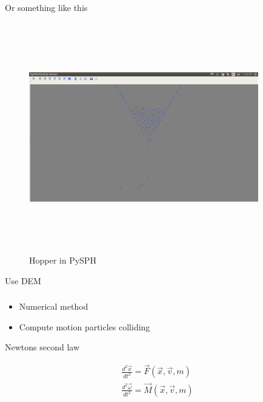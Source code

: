 \documentclass[pdf]
{beamer}
\begin{document}
\begin{frame}{Or something like this}


\begin{figure}[htbp]
\centerline{\includegraphics[width=10cm,height=10cm,keepaspectratio]{pysph_dem1.png}}
\caption[]{\label{fig:pysph_dem} Hopper in PySPH}
\end{figure}

\end{frame}














\begin{frame}{Use DEM}
  \frametitle{}


\begin{itemize}
\item Numerical method
\item Compute motion particles colliding
\end{itemize}

\end{frame}







\begin{frame}{Newtons second law}

\begin{align}
  \label{eq:newton_equation_of_motion}
  \frac{d^2 \vec{x}}{dt^2} = \vec{F}(\vec{x}, \vec{v}, m)\\
  \frac{d^2 \vec{\omega}}{dt^2} = \vec{M}(\vec{x}, \vec{v}, m)
\end{align}


\end{frame}
\end{document}
